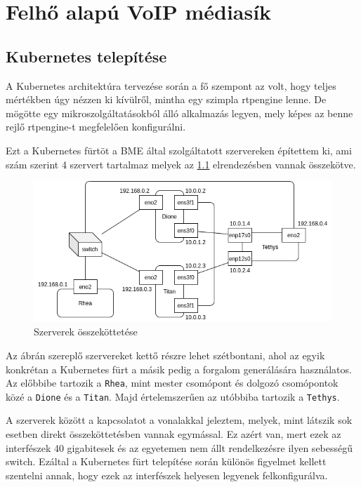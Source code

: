 \chapter{Felhő alapú VoIP médiasík}

\section{Kubernetes telepítése}

A Kubernetes architektúra tervezése során a fő szempont az volt, hogy teljes mértékben 
úgy nézzen ki kívülről, mintha egy szimpla rtpengine lenne. De mögötte egy 
mikroszolgáltatásokból álló alkalmazás legyen, mely képes az benne rejlő rtpengine-t 
megfelelően konfigurálni.

Ezt a Kubernetes fürtöt a BME által szolgáltatott szervereken építettem ki, ami szám 
szerint 4 szervert tartalmaz melyek az \ref{fig:servers} elrendezésben vannak összekötve.

\begin{figure}[!ht]
	\centering
	\includegraphics[width=1\textwidth, keepaspectratio]{figures/servers.png}
	\caption{Szerverek összeköttetése}
	\label{fig:servers}
\end{figure}

Az ábrán szereplő szervereket kettő részre lehet szétbontani, ahol az egyik
konkrétan a Kubernetes fürt a másik pedig a forgalom generálására használatos.
Az előbbibe tartozik a \texttt{Rhea}, mint mester csomópont és dolgozó csomópontok közé 
a \texttt{Dione} és a \texttt{Titan}. Majd értelemszerűen az utóbbiba tartozik a 
\texttt{Tethys}. 

A szerverek között a kapcsolatot a vonalakkal jeleztem, melyek, mint látszik
sok esetben direkt összeköttetésben vannak egymással. Ez azért van, mert ezek
az interfészek 40 gigabitesek és az egyetemen nem állt rendelkezésre ilyen 
sebességű switch. Ezáltal a Kubernetes fürt telepítése során különös figyelmet
kellett szentelni annak, hogy ezek az interfészek helyesen legyenek felkonfigurálva.

